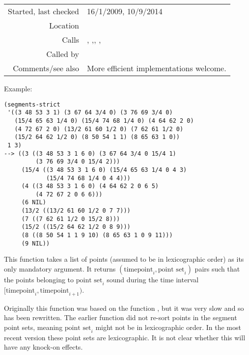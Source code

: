 \vspace{0.3cm}
\begin{tabular}{r|p{8cm}}
Started, last checked & 16/1/2009, 10/9/2014 \\
Location & \nameref{sec:segmentation} \\
Calls & \nameref{fun:append-offtimes}, \nameref{fun:enumerate-append},\newline \nameref{fun:my-last}, \nameref{fun:nth-list-of-lists},\newline \nameref{fun:points-belonging-to-time-interval} \\
Called by & \\
Comments/see also & More efficient implementations welcome.
\end{tabular}

\vspace{0.5cm}
\noindent Example:
\begin{verbatim}
(segments-strict
 '((3 48 53 3 1) (3 67 64 3/4 0) (3 76 69 3/4 0)
   (15/4 65 63 1/4 0) (15/4 74 68 1/4 0) (4 64 62 2 0)
   (4 72 67 2 0) (13/2 61 60 1/2 0) (7 62 61 1/2 0)
   (15/2 64 62 1/2 0) (8 50 54 1 1) (8 65 63 1 0))
 1 3)
--> ((3 ((3 48 53 3 1 6 0) (3 67 64 3/4 0 15/4 1)
         (3 76 69 3/4 0 15/4 2)))
     (15/4 ((3 48 53 3 1 6 0) (15/4 65 63 1/4 0 4 3)
            (15/4 74 68 1/4 0 4 4)))
     (4 ((3 48 53 3 1 6 0) (4 64 62 2 0 6 5)
         (4 72 67 2 0 6 6)))
     (6 NIL)
     (13/2 ((13/2 61 60 1/2 0 7 7)))
     (7 ((7 62 61 1/2 0 15/2 8)))
     (15/2 ((15/2 64 62 1/2 0 8 9)))
     (8 ((8 50 54 1 1 9 10) (8 65 63 1 0 9 11)))
     (9 NIL))
\end{verbatim}

\noindent This function takes a list of points (assumed
to be in lexicographic order) as its only mandatory
argument. It returns
$(\text{timepoint}_i, \text{point set}_i)$ pairs such
that the points belonging to $\text{point set}_i$ sound
during the time interval
$[\text{timepoint}_i, \text{timepoint}_{i+1})$.

Originally this function was based on the function
, but it was very slow and so has
been rewritten. The earlier function did not re-sort
points in the segment point sets, meaning
$\text{point set}_i$ might not be in lexicographic
order. In the most recent version these point sets are
lexicographic. It is not clear whether this will have
any knock-on effects.

























